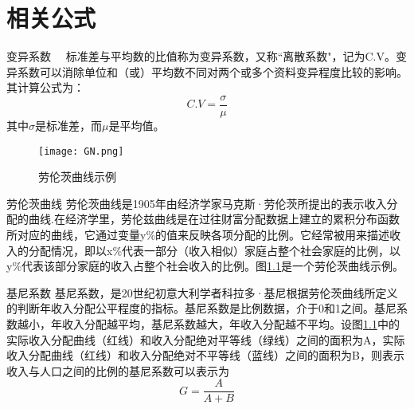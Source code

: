 
\chapter{相关公式}
\begin{section}{变异系数}
　标准差与平均数的比值称为变异系数，又称“离散系数"，记为C.V。变异系数可以消除单位和（或）平均数不同对两个或多个资料变异程度比较的影响。其计算公式为：
\begin{equation}
    C.V = \frac{\sigma }{\mu }
\end{equation}
其中$\sigma$是标准差，而$\mu$是平均值。
\end{section}

\begin{figure}[t]
	\centering
	\texttt{[image: GN.png]}
	\caption{劳伦茨曲线示例}
	\label{Fig:GN}
\end{figure}

\begin{section}{劳伦茨曲线}
劳伦茨曲线是1905年由经济学家马克斯·劳伦茨所提出的表示收入分配的曲线.在经济学里，劳伦兹曲线是在过往财富分配数据上建立的累积分布函数所对应的曲线，它通过变量y\%的值来反映各项分配的比例。它经常被用来描述收入的分配情况，即以x\%代表一部分（收入相似）家庭占整个社会家庭的比例，以y\%代表该部分家庭的收入占整个社会收入的比例。图\ref{Fig:GN}是一个劳伦茨曲线示例。
\end{section}

\begin{section}{基尼系数}
基尼系数，是20世纪初意大利学者科拉多·基尼根据劳伦茨曲线所定义的判断年收入分配公平程度的指标。基尼系数是比例数据，介于0和1之间。基尼系数越小，年收入分配越平均，基尼系数越大，年收入分配越不平均。设图\ref{Fig:GN}中的实际收入分配曲线（红线）和收入分配绝对平等线（绿线）之间的面积为A，实际收入分配曲线（红线）和收入分配绝对不平等线（蓝线）之间的面积为B，则表示收入与人口之间的比例的基尼系数可以表示为
\begin{equation}
    G = \frac{A }{A+B }
\end{equation}

\end{section}
